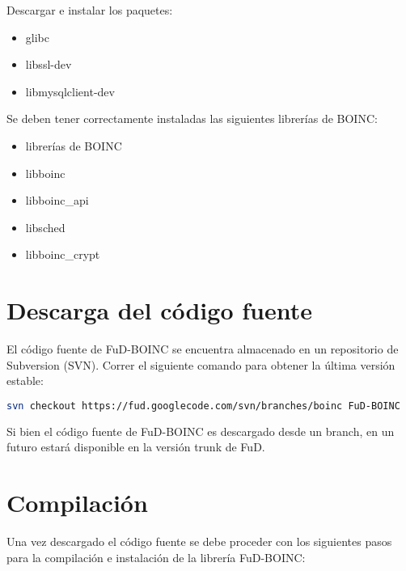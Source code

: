 \documentclass[12pt,spanish,a4paper]{report}
\begin{document}
Descargar e instalar los paquetes:
\begin{itemize}
 \item glibc
 \item libssl-dev
 \item libmysqlclient-dev
\end{itemize}

Se deben tener correctamente instaladas las siguientes librerías de BOINC:

\begin{itemize}
 \item librerías de BOINC
 \item libboinc
 \item libboinc\_api
 \item libsched
 \item libboinc\_crypt
\end{itemize}


\section{Descarga del código fuente}

El código fuente de FuD-BOINC se encuentra almacenado en un repositorio de Subversion (SVN). Correr el siguiente comando para obtener la última versión estable:

\begin{lstlisting}[frame=shadowbox, language=bash, basicstyle=\footnotesize, backgroundcolor=\color{gris}]
 svn checkout https://fud.googlecode.com/svn/branches/boinc FuD-BOINC
\end{lstlisting}

Si bien el código fuente de FuD-BOINC es descargado desde un branch, en un futuro estará disponible en la versión trunk de FuD.

\section{Compilación}

Una vez descargado el código fuente se debe proceder con los siguientes pasos para la compilación e instalación de la librería FuD-BOINC:
\end{document}

